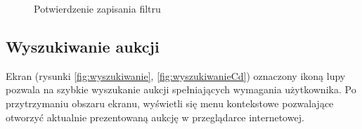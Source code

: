 \documentclass[a4paper,twoside,titlepage,openright]{book}
\begin{document}
\begin{figure}[h]
\begin{minipage}[t]{0.3\textwidth}
		\caption{Potwierdzenie zapisania filtru}
		\label{fig:dodawanieFiltrowPotwierdzenie}
	\end{minipage}
\end{figure}




\subsection{Wyszukiwanie aukcji}
Ekran (rysunki \ref{fig:wyszukiwanie}, \ref{fig:wyszukiwanieCd}) oznaczony ikoną lupy pozwala na szybkie wyszukanie aukcji spełniających wymagania użytkownika. Po przytrzymaniu obszaru ekranu, wyświetli się menu kontekstowe pozwalające otworzyć aktualnie prezentowaną aukcję w przeglądarce internetowej.
\end{document}
